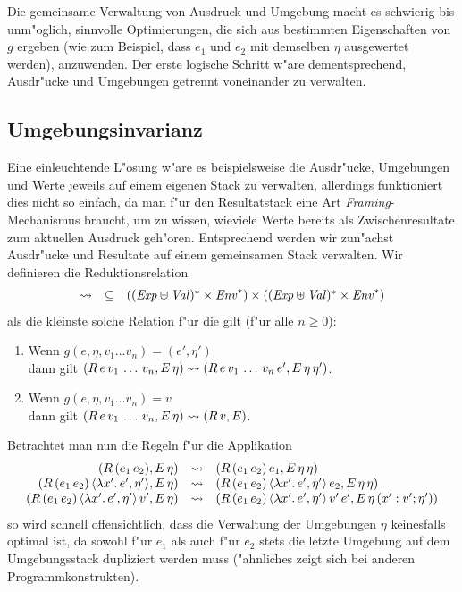 \documentclass[12pt,a4paper,draft]{article}
\begin{document}
Die gemeinsame Verwaltung von Ausdruck und Umgebung macht es schwierig bis unm"oglich, sinnvolle Optimierungen,
die sich aus bestimmten Eigenschaften von $g$ ergeben (wie zum Beispiel, dass $e_1$ und $e_2$ mit demselben
$\eta$ ausgewertet werden), anzuwenden. Der erste logische Schritt w"are dementsprechend, Ausdr"ucke und
Umgebungen getrennt voneinander zu verwalten.


\subsection{Umgebungsinvarianz}

Eine einleuchtende L"osung w"are es beispielsweise die Ausdr"ucke, Umgebungen und Werte jeweils auf einem
eigenen Stack zu verwalten, allerdings funktioniert dies nicht so einfach, da man f"ur den Resultatstack eine
Art \emph{Framing}-Mechanismus braucht, um zu wissen, wieviele Werte bereits als Zwischenresultate zum
aktuellen Ausdruck geh"oren. Entsprechend werden wir zun"achst Ausdr"ucke und Resultate auf einem gemeinsamen
Stack verwalten. Wir definieren die Reduktionsrelation
\[\begin{array}{rcl}
  \rightsquigarrow & \subseteq & ((\mathit{Exp} \uplus \mathit{Val})^* \times \mathit{Env}^*) \times ((\mathit{Exp} \uplus \mathit{Val})^* \times \mathit{Env}^*)
\end{array}\]
als die kleinste solche Relation f"ur die gilt (f"ur alle $n \ge 0$):
\begin{enumerate}
\item Wenn $g(e,\eta,v_1 \ldots v_n) = (e',\eta')$ \\
  dann gilt $(R\,e\,v_1\,\ldots\,v_n,E\,\eta) \rightsquigarrow (R\,e\,v_1\,\ldots\,v_n\,e',E\,\eta\,\eta')$.
\item Wenn $g(e,\eta,v_1 \ldots v_n) = v$ \\
  dann gilt $(R\,e\,v_1\,\ldots\,v_n,E\,\eta) \rightsquigarrow (R\,v,E)$.
\end{enumerate}
Betrachtet man nun die Regeln f"ur die Applikation
\[\begin{array}{rcl}
  (R\,({e_1}\,{e_2}),E\,\eta)
  &\rightsquigarrow& (R\,({e_1}\,{e_2})\,e_1,E\,\eta\,\eta) \\
  (R\,({e_1}\,{e_2})\,\langle{\lambda{x'}.\,{e'}},{\eta'}\rangle,E\,\eta)
  &\rightsquigarrow& (R\,({e_1}\,{e_2})\,\langle{\lambda{x'}.\,{e'}},{\eta'}\rangle\,e_2,E\,\eta\,\eta) \\
  (R\,({e_1}\,{e_2})\,\langle{\lambda{x'}.\,{e'}},{\eta'}\rangle\,v',E\,\eta)
  &\rightsquigarrow& (R\,({e_1}\,{e_2})\,\langle{\lambda{x'}.\,{e'}},{\eta'}\rangle\,v'\,e',E\,\eta\,(x':v';\eta')) \\
\end{array}\]
so wird schnell offensichtlich, dass die Verwaltung der Umgebungen $\eta$ keinesfalls optimal ist,
da sowohl f"ur $e_1$ als auch f"ur $e_2$ stets die letzte Umgebung auf dem Umgebungsstack dupliziert
werden muss ("ahnliches zeigt sich bei anderen Programmkonstrukten).
\end{document}
